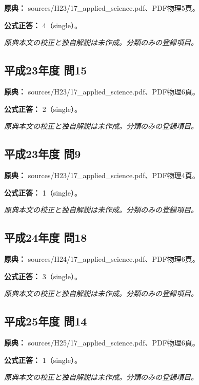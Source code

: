 \noindent\textbf{原典：} sources/H23/17\_applied\_science.pdf、PDF物理5頁。

\textbf{公式正答：} 4（single）。

\par\textit{原典本文の校正と独自解説は未作成。分類のみの登録項目。}

\subsection{平成23年度 問15}
\label{q:h23-reg-applied-15}

\noindent\textbf{原典：} sources/H23/17\_applied\_science.pdf、PDF物理6頁。

\textbf{公式正答：} 2（single）。

\par\textit{原典本文の校正と独自解説は未作成。分類のみの登録項目。}

\subsection{平成23年度 問9}
\label{q:h23-reg-applied-09}

\noindent\textbf{原典：} sources/H23/17\_applied\_science.pdf、PDF物理4頁。

\textbf{公式正答：} 1（single）。

\par\textit{原典本文の校正と独自解説は未作成。分類のみの登録項目。}

\subsection{平成24年度 問18}
\label{q:h24-reg-applied-18}

\noindent\textbf{原典：} sources/H24/17\_applied\_science.pdf、PDF物理6頁。

\textbf{公式正答：} 3（single）。

\par\textit{原典本文の校正と独自解説は未作成。分類のみの登録項目。}

\subsection{平成25年度 問14}
\label{q:h25-reg-applied-14}

\noindent\textbf{原典：} sources/H25/17\_applied\_science.pdf、PDF物理6頁。

\textbf{公式正答：} 1（single）。

\par\textit{原典本文の校正と独自解説は未作成。分類のみの登録項目。}

